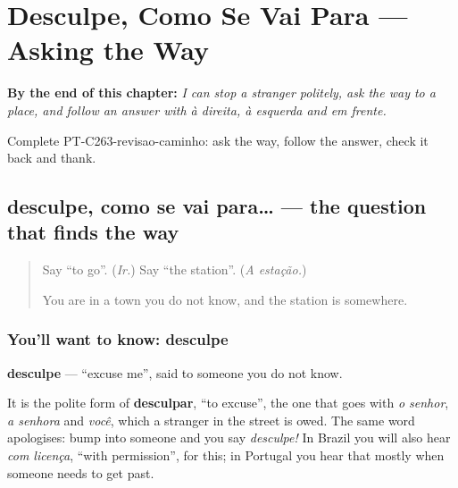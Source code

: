
\chapter{Desculpe, Como Se Vai Para --- Asking the Way}
\label{ch:pt-asking-the-way}

\begin{chapteropening}
\textbf{By the end of this chapter:} \emph{I can stop a stranger politely, ask the way to a place, and follow an answer with à direita, à esquerda and em frente.}

Complete PT-C263-revisao-caminho: ask the way, follow the answer, check it back and thank.
\end{chapteropening}

\section[desculpe, como se vai para…?]{desculpe, como se vai para… — the question that finds the way}

\label{lesson:PT-C263-desculpe}



\begin{quote}
Say \textquotedblleft{}to go\textquotedblright{}. (\emph{Ir.}) Say \textquotedblleft{}the station\textquotedblright{}. (\emph{A estação.})

You are in a town you do not know, and the station is somewhere.
\end{quote}

\subsection*{You'll want to know: desculpe}
\textbf{desculpe} — \textquotedblleft{}excuse me\textquotedblright{}, said to someone you do not know.

It is the polite form of \textbf{desculpar}, \textquotedblleft{}to excuse\textquotedblright{}, the one that goes with \emph{o senhor}, \emph{a senhora} and \emph{você}, which a stranger in the street is owed. The same word apologises: bump into someone and you say \emph{desculpe!} In Brazil you will also hear \emph{com licença}, \textquotedblleft{}with permission\textquotedblright{}, for this; in Portugal you hear that mostly when someone needs to get past.

